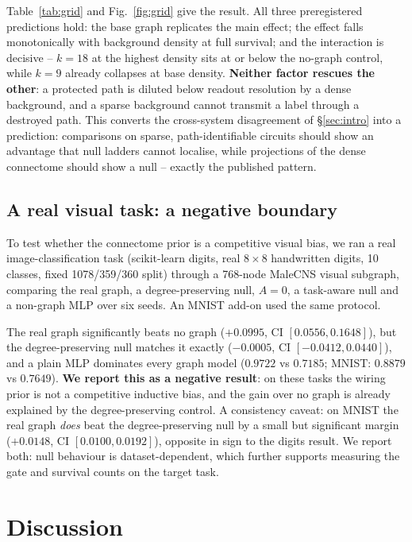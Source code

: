 \documentclass[10pt,twocolumn,letterpaper]{article}
\begin{document}
Table~\ref{tab:grid} and Fig.~\ref{fig:grid} give the result. All three
preregistered predictions hold: the base graph replicates the main effect;
the effect falls monotonically with background density at full survival; and
the interaction is decisive -- $k{=}18$ at the highest density sits at or
below the no-graph control, while $k{=}9$ already collapses at base density.
\textbf{Neither factor rescues the other}: a protected path is diluted below
readout resolution by a dense background, and a sparse background cannot
transmit a label through a destroyed path. This converts the cross-system
disagreement of \S\ref{sec:intro} into a prediction: comparisons on sparse,
path-identifiable circuits should show an advantage that null ladders cannot
localise, while projections of the dense connectome should show a null --
exactly the published pattern.

\subsection{A real visual task: a negative boundary}
\label{sec:visualtask}

To test whether the connectome prior is a competitive visual bias, we ran a
real image-classification task (scikit-learn digits, real $8\times8$
handwritten digits, 10 classes, fixed 1078/359/360 split) through a 768-node
MaleCNS visual subgraph, comparing the real graph, a degree-preserving null,
$A\!=\!0$, a task-aware null and a non-graph MLP over six seeds. An MNIST
add-on used the same protocol.

The real graph significantly beats no graph ($+0.0995$, CI
$[0.0556,0.1648]$), but the degree-preserving null matches it exactly
($-0.0005$, CI $[-0.0412,0.0440]$), and a plain MLP dominates every graph
model ($0.9722$ vs $0.7185$; MNIST: $0.8879$ vs $0.7649$).
\textbf{We report this as a negative result}: on these tasks the wiring prior
is not a competitive inductive bias, and the gain over no graph is already
explained by the degree-preserving control. A consistency caveat: on MNIST
the real graph \emph{does} beat the degree-preserving null by a small but
significant margin ($+0.0148$, CI $[0.0100,0.0192]$), opposite in sign to
the digits result. We report both: null behaviour is dataset-dependent, which
further supports measuring the gate and survival counts on the target task.

\section{Discussion}
\label{sec:discussion}
\end{document}
